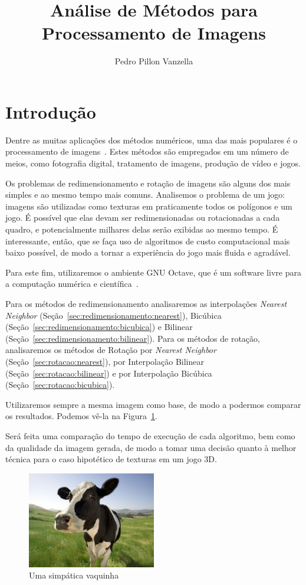 \documentclass[12pt]{article}
\title{Análise de Métodos para Processamento de Imagens}
\author{Pedro Pillon Vanzella}
\begin{document}
 

\maketitle
     
\section{Introdução}\label{sec:introducao}

Dentre as muitas aplicações dos métodos numéricos, uma das mais populares é o processamento de imagens~\cite{acharya:2005}. Estes métodos são empregados em um número de meios, como fotografia digital, tratamento de imagens, produção de vídeo e jogos.

Os problemas de redimensionamento e rotação de imagens são alguns dos mais simples e ao mesmo tempo mais comuns. Analisemos o problema de um jogo: imagens são utilizadas como texturas em praticamente todos os polígonos e um jogo. É possível que elas devam ser redimensionadas ou rotacionadas a cada quadro, e potencialmente milhares delas serão exibidas ao mesmo tempo. É interessante, então, que se faça uso de algoritmos de custo computacional mais baixo possível, de modo a tornar a experiência do jogo mais fluida e agradável.

Para este fim, utilizaremos o ambiente GNU Octave, que é um software livre para a computação numérica e científica~\cite{eaton:2008}.

Para os métodos de redimensionamento analisaremos as interpolações \textit{Nearest Neighbor} (Seção~\ref{sec:redimensionamento:nearest}), Bicúbica (Seção~\ref{sec:redimensionamento:bicubica}) e Bilinear (Seção~\ref{sec:redimensionamento:bilinear}). Para os métodos de rotação, analisaremos os métodos de Rotação por \textit{Nearest Neighbor} (Seção~\ref{sec:rotacao:nearest}), por Interpolação Bilinear (Seção~\ref{sec:rotacao:bilinear}) e por Interpolação Bicúbica (Seção~\ref{sec:rotacao:bicubica}).

Utilizaremos sempre a mesma imagem como base, de modo a podermos comparar os resultados. Podemos vê-la na Figura~\ref{fig:vaca:semnada}.

Será feita uma comparação do tempo de execução de cada algoritmo, bem como da qualidade da imagem gerada, de modo a tomar uma decisão quanto à melhor técnica para o caso hipotético de texturas em um jogo 3D.

\begin{figure}[H]
\centering
\includegraphics[width=0.5\textwidth]{cow_small.png}
\caption{Uma simpática vaquinha}
\label{fig:vaca:semnada}
\end{figure}
\end{document}
